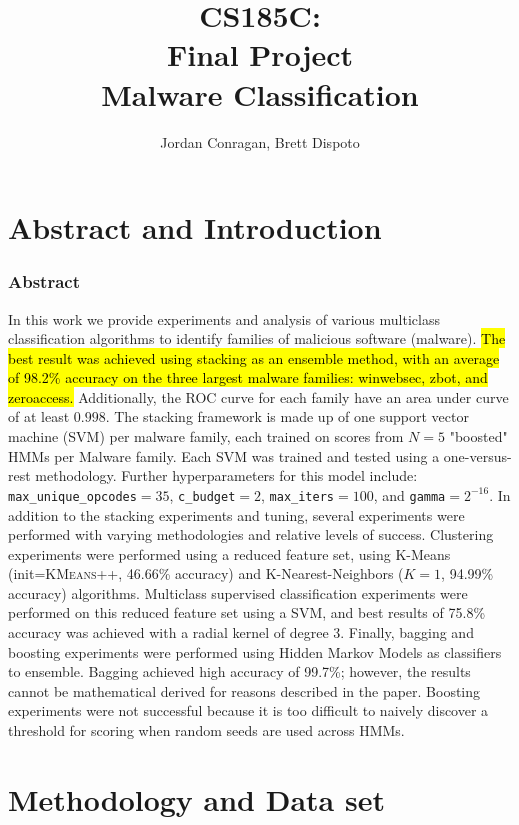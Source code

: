 \documentclass[12pt]{article}
\title{CS185C: \\ 
Final Project \\
Malware Classification}
\author{Jordan Conragan,  Brett Dispoto}
\begin{document}
\maketitle
\tableofcontents
\newpage

\part{Abstract and Introduction}
\section{Abstract}
In this work we provide experiments and analysis of various multiclass classification algorithms to identify families of malicious software (malware). \hl{The best result was achieved using stacking as an ensemble method, with an average of 98.2\% accuracy on the three largest malware families:  winwebsec, zbot, and zeroaccess.} Additionally, the ROC curve for each family have an area under curve of at least $0.998$. The stacking framework is made up of one support vector machine (SVM) per malware family, each trained on scores from $N=5$ "boosted" HMMs per Malware family. Each SVM was trained and tested using a one-versus-rest methodology. Further hyperparameters for this model include: \texttt{max\_unique\_opcodes}$=35$, \texttt{c\_budget}$=2$, \texttt{max\_iters}$=100$, and \texttt{gamma}$=2^{-16}$. In addition to the stacking experiments and tuning, several experiments were performed with varying methodologies and relative levels of success. Clustering experiments were performed using a reduced feature set, using K-Means  (init=\textsc{KMeans++}, 46.66\% accuracy) and K-Nearest-Neighbors ($K=1$, 94.99\% accuracy) algorithms. Multiclass supervised classification experiments were performed on this reduced feature set using a SVM, and best results of 75.8\% accuracy was achieved with a radial kernel of degree 3. Finally, bagging and boosting experiments were performed using Hidden Markov Models as classifiers to ensemble. Bagging achieved high accuracy of 99.7\%; however, the results cannot be mathematical derived for reasons described in the paper. Boosting experiments were not successful because it is too difficult to naively discover a threshold for scoring when random seeds are used across HMMs.
\part{Methodology and Data set}
\end{document}
